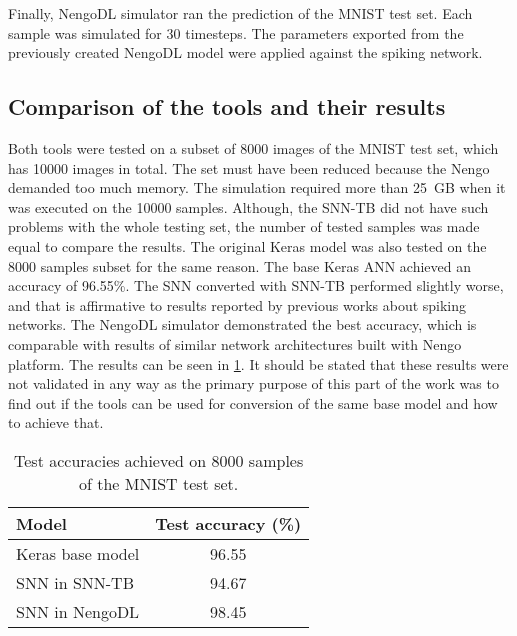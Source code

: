 Finally, NengoDL simulator ran the prediction of the MNIST test set. Each sample was simulated for 30 timesteps. The parameters exported from the previously created NengoDL model were applied against the spiking network.

\subsection{Comparison of the tools and their results}
Both tools were tested on a subset of 8000 images of the MNIST test set, which has 10000 images in total. The set must have been reduced because the Nengo demanded too much memory. The simulation required more than 25~GB when it was executed on the 10000 samples. Although, the SNN-TB did not have such problems with the whole testing set, the number of tested samples was made equal to compare the results. The original Keras model was also tested on the 8000 samples subset for the same reason. The base Keras ANN achieved an accuracy of 96.55\%. The SNN converted with SNN-TB performed slightly worse, and that is affirmative to results reported by previous works about spiking networks. The NengoDL simulator demonstrated the best accuracy, which is comparable with results of similar network architectures built with Nengo platform. The results can be seen in \cref{tab:MNIST_results}. It should be stated that these results were not validated in any way as the primary purpose of this part of the work was to find out if the tools can be used for conversion of the same base model and how to achieve that.

\begin{table}[htbp]
    \centering
    \begin{tabularx}{\linewidth}{>{\raggedright\arraybackslash}Xc}
    \toprule
        Model & Test accuracy (\%) \\
    \midrule
        Keras base model & 96.55 \\
        SNN in SNN-TB & 94.67 \\
        SNN in NengoDL & 98.45 \\
    \bottomrule
    \end{tabularx}
    \caption{Test accuracies achieved on 8000 samples of the MNIST test set.}
    \label{tab:MNIST_results}
\end{table}

